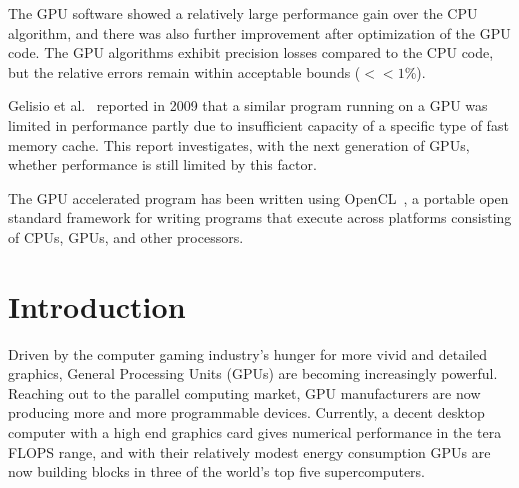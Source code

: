 \documentclass[11pt,twoside]{report}
\begin{document}
\indent The GPU software showed a relatively large performance gain over the CPU algorithm, and there was also further improvement after optimization of the GPU code. The GPU algorithms exhibit precision losses compared to the CPU code, but the relative errors remain within acceptable bounds ($<< 1$\%).

\indent Gelisio et al.~\cite{ISI:000277392600034}  reported in 2009 that a similar program running on a GPU was limited in performance  partly due to insufficient capacity of a specific type of fast memory cache. This report investigates, with the next generation of GPUs, whether performance is still limited by this factor.

\indent The GPU accelerated program has been written using OpenCL~\cite{OpenCL.spec}, a portable open standard framework for writing programs that execute across platforms consisting of CPUs, GPUs, and other processors.






\tableofcontents
\pagebreak

\printnomenclature
\chapter{Introduction}
Driven by the computer gaming industry's hunger for more vivid and detailed graphics, General Processing Units (GPUs) are becoming increasingly powerful. Reaching out to the parallel computing market, GPU manufacturers are now producing more and more programmable devices. Currently, a decent desktop computer with a high end graphics card gives numerical performance in the tera FLOPS range, and with their relatively modest energy consumption GPUs are now building blocks in three of the world's top five supercomputers.
\end{document}
